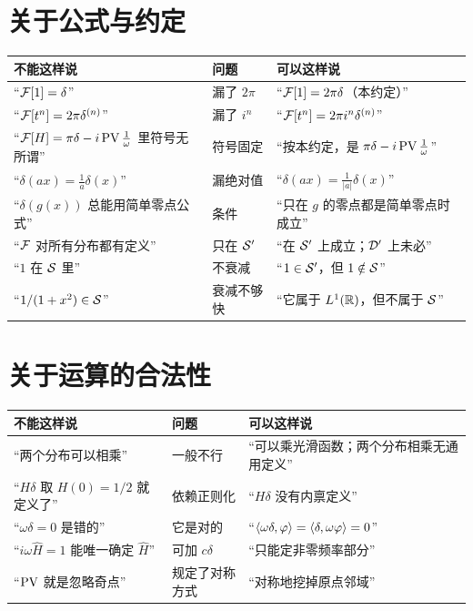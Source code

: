 \section{关于公式与约定}

\begin{center}
\small
\renewcommand{\arraystretch}{1.45}
\begin{tabularx}{\textwidth}{@{}L{4.9cm}L{4.2cm}Y@{}}
\toprule
不能这样说 & 问题 & 可以这样说 \\
\midrule
“$\mathcal{F}[1]=\delta$” & 漏了 $2\pi$ & “$\mathcal{F}[1]=2\pi\delta$（本约定）” \\
“$\mathcal{F}[t^{n}]=2\pi\delta^{(n)}$” & 漏了 $i^{n}$ & “$\mathcal{F}[t^{n}]=2\pi i^{n}\delta^{(n)}$” \\
“$\mathcal{F}[H]=\pi\delta-i\operatorname{PV}\frac{1}{\omega}$ 里符号无所谓” & 符号固定 & “按本约定，是 $\pi\delta-i\operatorname{PV}\frac1\omega$” \\
“$\delta(ax)=\frac1a\delta(x)$” & 漏绝对值 & “$\delta(ax)=\frac{1}{|a|}\delta(x)$” \\
“$\delta(g(x))$ 总能用简单零点公式” & 条件 & “只在 $g$ 的零点都是简单零点时成立” \\
“$\mathcal{F}$ 对所有分布都有定义” & 只在 $\mathcal{S}'$ & “在 $\mathcal{S}'$ 上成立；$\mathcal{D}'$ 上未必” \\
“$1$ 在 $\mathcal{S}$ 里” & 不衰减 & “$1\in\mathcal{S}'$，但 $1\notin\mathcal{S}$” \\
“$1/(1+x^{2})\in\mathcal{S}$” & 衰减不够快 & “它属于 $L^1(\mathbb{R})$，但不属于 $\mathcal{S}$” \\
\bottomrule
\end{tabularx}
\end{center}

\section{关于运算的合法性}

\begin{center}
\small
\renewcommand{\arraystretch}{1.45}
\begin{tabularx}{\textwidth}{@{}L{4.9cm}L{4.2cm}Y@{}}
\toprule
不能这样说 & 问题 & 可以这样说 \\
\midrule
“两个分布可以相乘” & 一般不行 & “可以乘光滑函数；两个分布相乘无通用定义” \\
“$H\delta$ 取 $H(0)=1/2$ 就定义了” & 依赖正则化 & “$H\delta$ 没有内禀定义” \\
“$\omega\delta=0$ 是错的” & 它是对的 & “$\langle \omega\delta,\varphi\rangle=\langle \delta,\omega\varphi\rangle=0$” \\
“$i\omega\hat H=1$ 能唯一确定 $\hat H$” & 可加 $c\delta$ & “只能定非零频率部分” \\
“$\operatorname{PV}$ 就是忽略奇点” & 规定了对称方式 & “对称地挖掉原点邻域” \\
\bottomrule
\end{tabularx}
\end{center}

